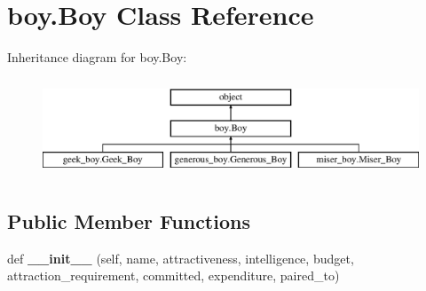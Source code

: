 \hypertarget{classboy_1_1_boy}{}\section{boy.\+Boy Class Reference}
\label{classboy_1_1_boy}
Inheritance diagram for boy.\+Boy\+:\begin{figure}[H]
\begin{center}
\leavevmode
\includegraphics[height=2.962963cm]{classboy_1_1_boy}
\end{center}
\end{figure}
\subsection*{Public Member Functions}
\begin{DoxyCompactItemize}
\item 
\mbox{\label{classboy_1_1_boy_a22ebd2a16d1a7488e5bdda468a262d31}} 
def {\bfseries \+\_\+\+\_\+init\+\_\+\+\_\+} (self, name, attractiveness, intelligence, budget, attraction\+\_\+requirement, committed, expenditure, paired\+\_\+to)
\end{DoxyCompactItemize}
